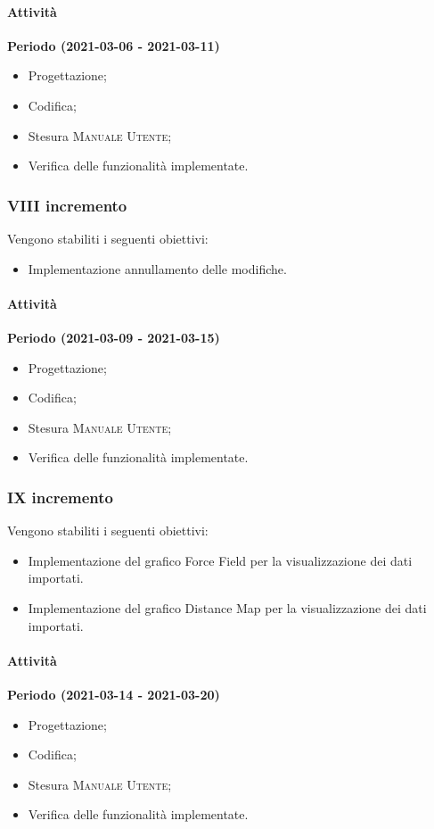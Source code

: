 \documentclass[../piano_di_progetto.tex]{subfiles}
\begin{document}
\paragraph{Attività}
\noindent\textbf{Periodo (2021-03-06 - 2021-03-11)}
\begin{itemize}
    \item Progettazione;
    \item Codifica;
    \item Stesura \textsc{Manuale Utente};
    \item Verifica delle funzionalità implementate.
\end{itemize}


\subsubsection{VIII incremento}
Vengono stabiliti i seguenti obiettivi:
\begin{itemize}
    \item Implementazione annullamento delle modifiche.
\end{itemize}
\paragraph{Attività}
\noindent\textbf{Periodo (2021-03-09 - 2021-03-15)}
\begin{itemize}
    \item Progettazione;
    \item Codifica;
    \item Stesura \textsc{Manuale Utente};
    \item Verifica delle funzionalità implementate.
\end{itemize}


\subsubsection{IX incremento}
Vengono stabiliti i seguenti obiettivi:
\begin{itemize}
    \item Implementazione del grafico Force Field per la visualizzazione dei dati importati.
    \item Implementazione del grafico Distance Map per la visualizzazione dei dati importati.
\end{itemize}
\paragraph{Attività}
\noindent\textbf{Periodo (2021-03-14 - 2021-03-20)}
\begin{itemize}
    \item Progettazione;
    \item Codifica;
    \item Stesura \textsc{Manuale Utente};
    \item Verifica delle funzionalità implementate.
\end{itemize}
\end{document}
